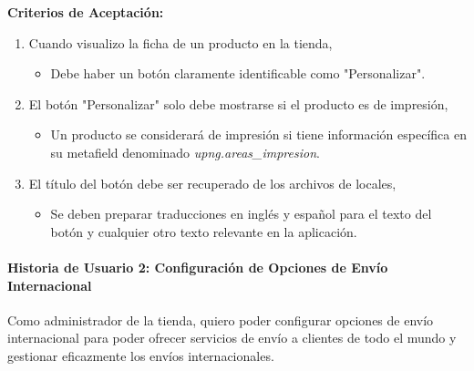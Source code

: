 \documentclass[12pt]{article}
\newcommand{\subsubsubsection}[1]{\paragraph{#1}}
\begin{document}
\vspace{0.5cm}
\textbf{Criterios de Aceptación:}
\begin{enumerate}[label=\arabic*.]
    \item Cuando visualizo la ficha de un producto en la tienda,
          \begin{itemize}[label=--]
              \item Debe haber un botón claramente identificable como "Personalizar".
          \end{itemize}
    \item El botón "Personalizar"  solo debe mostrarse si el producto es de impresión,
          \begin{itemize}[label=--]
              \item Un producto se considerará de impresión si tiene información específica en su metafield denominado \textit{upng.areas\_impresion}.
          \end{itemize}
    \item El título del botón debe ser recuperado de los archivos de locales,
          \begin{itemize}[label=--]
              \item Se deben preparar traducciones en inglés y español para el texto del botón y cualquier otro texto relevante en la aplicación.
          \end{itemize}
\end{enumerate}


\subsubsubsection{Historia de Usuario 2: Configuración de Opciones de Envío Internacional}\label{sec:historia2}

Como administrador de la tienda,
quiero poder configurar opciones de envío internacional
para poder ofrecer servicios de envío a clientes de todo el mundo y gestionar eficazmente los envíos internacionales.
\end{document}
